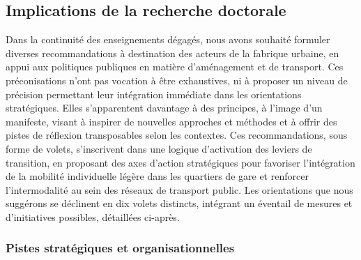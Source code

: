 \begin{refsegment}
\section*{Implications de la recherche doctorale
    \label{conclusion-generale:implications}
    }

Dans la continuité des enseignements dégagés, nous avons souhaité formuler diverses recommandations à destination des acteurs de la fabrique urbaine, en appui aux politiques publiques en matière d'aménagement et de transport. Ces préconisations n'ont pas vocation à être exhaustives, ni à proposer un niveau de précision permettant leur intégration immédiate dans les orientations stratégiques. Elles s'apparentent davantage à des principes, à l'image d'un manifeste, visant à inspirer de nouvelles approches et méthodes et à offrir des pistes de réflexion transposables selon les contextes. Ces recommandations, sous forme de volets, s’inscrivent dans une logique d’activation des leviers de transition, en proposant des axes d’action stratégiques pour favoriser l’intégration de la mobilité individuelle légère dans les quartiers de gare et renforcer l’intermodalité au sein des réseaux de transport public. Les orientations que nous suggérons se déclinent en dix volets distincts, intégrant un éventail de mesures et d’initiatives possibles, détaillées ci-après.%

\subsubsection*{Pistes stratégiques et organisationnelles
    \label{conclusion-generale:implications-gouvernance}
    }


\end{refsegment}
